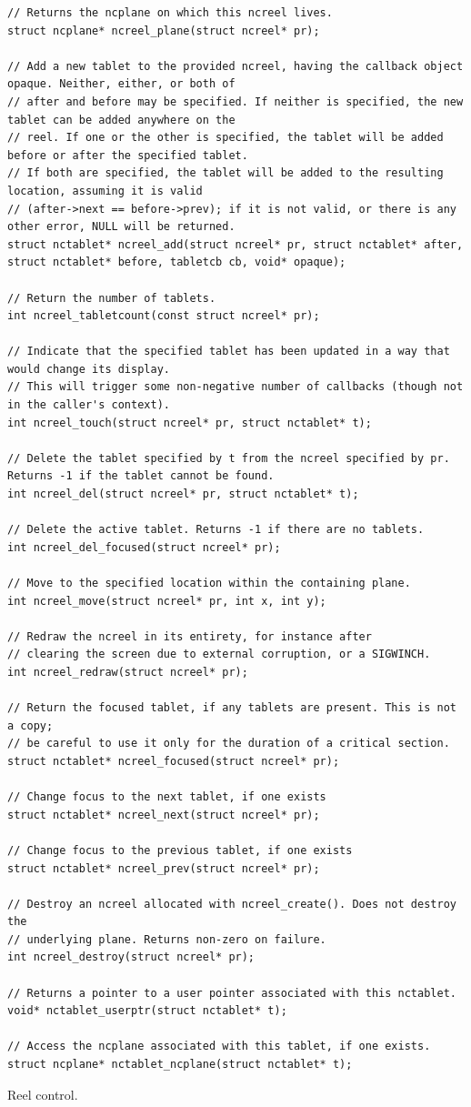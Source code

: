 \documentclass[letterpaper,10pt]{article}
\begin{document}
\begin{listing}[!htb]
\begin{verbatim}
// Returns the ncplane on which this ncreel lives.
struct ncplane* ncreel_plane(struct ncreel* pr);

// Add a new tablet to the provided ncreel, having the callback object opaque. Neither, either, or both of
// after and before may be specified. If neither is specified, the new tablet can be added anywhere on the
// reel. If one or the other is specified, the tablet will be added before or after the specified tablet.
// If both are specified, the tablet will be added to the resulting location, assuming it is valid
// (after->next == before->prev); if it is not valid, or there is any other error, NULL will be returned.
struct nctablet* ncreel_add(struct ncreel* pr, struct nctablet* after, struct nctablet* before, tabletcb cb, void* opaque);

// Return the number of tablets.
int ncreel_tabletcount(const struct ncreel* pr);

// Indicate that the specified tablet has been updated in a way that would change its display.
// This will trigger some non-negative number of callbacks (though not in the caller's context).
int ncreel_touch(struct ncreel* pr, struct nctablet* t);

// Delete the tablet specified by t from the ncreel specified by pr. Returns -1 if the tablet cannot be found.
int ncreel_del(struct ncreel* pr, struct nctablet* t);

// Delete the active tablet. Returns -1 if there are no tablets.
int ncreel_del_focused(struct ncreel* pr);

// Move to the specified location within the containing plane.
int ncreel_move(struct ncreel* pr, int x, int y);

// Redraw the ncreel in its entirety, for instance after
// clearing the screen due to external corruption, or a SIGWINCH.
int ncreel_redraw(struct ncreel* pr);

// Return the focused tablet, if any tablets are present. This is not a copy;
// be careful to use it only for the duration of a critical section.
struct nctablet* ncreel_focused(struct ncreel* pr);

// Change focus to the next tablet, if one exists
struct nctablet* ncreel_next(struct ncreel* pr);

// Change focus to the previous tablet, if one exists
struct nctablet* ncreel_prev(struct ncreel* pr);

// Destroy an ncreel allocated with ncreel_create(). Does not destroy the
// underlying plane. Returns non-zero on failure.
int ncreel_destroy(struct ncreel* pr);

// Returns a pointer to a user pointer associated with this nctablet.
void* nctablet_userptr(struct nctablet* t);

// Access the ncplane associated with this tablet, if one exists.
struct ncplane* nctablet_ncplane(struct nctablet* t);
\end{verbatim}
\caption{Reel control.}
\label{listing:reelcontrol}
\end{listing}
\end{document}
